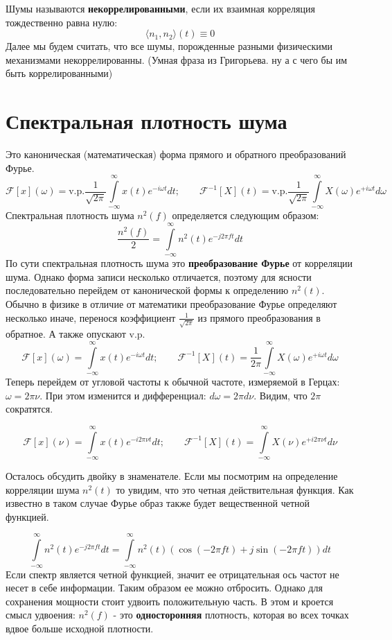 \documentclass[a4paper, 12pt]{article}
\begin{document}
Шумы называются \textbf{некоррелированными}, если их взаимная корреляция тождественно равна нулю:
$$
\langle n_1, n_2 \rangle (t) \equiv 0
$$
Далее мы будем считать, что все шумы, порожденные разными физическими механизмами некоррелированны. (Умная фраза из Григорьева. ну а с чего бы им быть коррелированными)

\section{Спектральная плотность шума}
Это каноническая (математическая) форма прямого и обратного преобразований Фурье.
$$
\mathcal{F}\left[x\right](\omega) = \text{v.p.}\frac{1}{\sqrt{2\pi}}\int\limits_{-\infty}^{\infty}x(t)e^{-i\omega t} dt; \qquad 
\mathcal{F}^{-1}\left[X\right](t) = \text{v.p.}\frac{1}{\sqrt{2\pi}}\int\limits_{-\infty}^{\infty}X(\omega)e^{+i\omega t} d\omega
$$
Спектральная плотность шума $n^2(f)$ определяется следующим образом:
$$
\frac{n^2(f)}{2} =\int\limits_{-\infty}^{\infty}n^2(t)e^{-j2\pi ft} dt 
$$
По сути спектральная плотность шума это \textbf{преобразование Фурье} от корреляции шума. Однако форма записи несколько отличается, поэтому для ясности последовательно перейдем от канонической формы к определению $n^2(t)$. 
Обычно в физике в отличие от математики преобразование Фурье определяют несколько иначе, перенося коэффициент $\frac{1}{\sqrt{2 \pi}}$ из прямого преобразования в обратное. А также опускают $\text{v.p.}$
$$
\mathcal{F}\left[x\right](\omega) = \int\limits_{-\infty}^{\infty}x(t)e^{-i\omega t} dt; \qquad 
\mathcal{F}^{-1}\left[X\right](t) = \frac{1}{2\pi}\int\limits_{-\infty}^{\infty}X(\omega)e^{+i \omega t} d\omega
$$
Теперь перейдем от угловой частоты к обычной частоте, измеряемой в Герцах: $\omega = 2 \pi \nu$. При этом изменится и дифференциал: $d\omega = 2\pi d\nu$. Видим, что $2\pi$ сократятся.

$$
\mathcal{F}\left[x\right](\nu) = \int\limits_{-\infty}^{\infty}x(t)e^{-i2\pi \nu t} dt; \qquad 
\mathcal{F}^{-1}\left[X\right](t) =\int\limits_{-\infty}^{\infty}X(\nu)e^{+i2\pi\nu t} d\nu
$$

Осталось обсудить двойку в знаменателе.
Если мы посмотрим на определение корреляции шума $n^2(t)$ то увидим, что это четная действительная функция. Как известно в таком случае Фурье образ также будет вещественной четной функцией. 

$$
\int\limits_{-\infty}^{\infty}n^2(t)e^{-j2\pi ft} dt = \int\limits_{-\infty}^{\infty}n^2(t)(\cos(-2\pi ft) + j\sin(-2\pi ft))dt
$$
Если спектр является четной функцией, значит ее отрицательная ось частот не несет в себе информации. Таким образом ее можно отбросить. Однако для сохранения мощности стоит удвоить положительную часть. В этом и кроется смысл удвоения: $n^2(f)$ - это \textbf{односторонняя} плотность, которая во всех точках вдвое больше исходной плотности.
\end{document}
